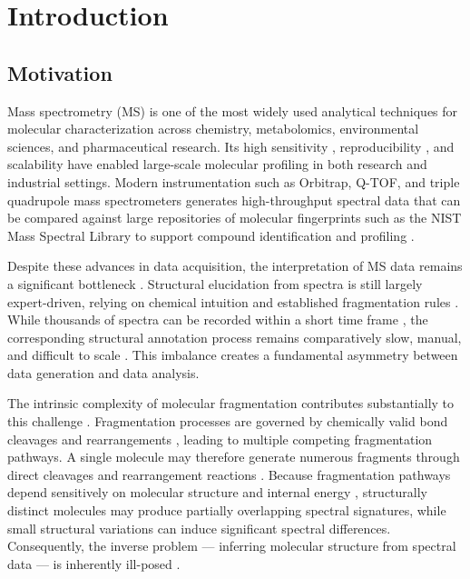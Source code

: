 \chapter{Introduction}
\label{ch:1}
\noindent
\section{Motivation}
Mass spectrometry (MS) is one of the most widely used analytical techniques for molecular characterization across chemistry, metabolomics, environmental sciences, and pharmaceutical research. \cite[p. 1]{Gross2006}
Its high sensitivity \cite[p.~1764]{Cramer2020}, reproducibility \cite[p.~1764]{Cramer2020}, and scalability \cite[p.~1764]{Cramer2020} 
have enabled large-scale molecular profiling in both research and industrial settings.
Modern instrumentation such as Orbitrap, Q-TOF, and triple quadrupole mass spectrometers 
generates high-throughput spectral data that can be compared against large repositories of molecular fingerprints 
such as the NIST Mass Spectral Library to support compound identification and profiling \cite[pp.~7274-7275]{Stein2012}.

Despite these advances in data acquisition, the interpretation of MS data remains a significant bottleneck \cite[p.~1]{Blazenovic2018}. 
Structural elucidation from spectra is still largely expert-driven, relying on chemical intuition and established fragmentation rules \cite[p.~11]{Blazenovic2018}. 
While thousands of spectra can be recorded within a short time frame \cite[p.~1]{Blazenovic2018}, the corresponding structural annotation process remains comparatively slow, manual, and difficult to scale \cite[p.~3]{Blazenovic2018}. 
This imbalance creates a fundamental asymmetry between data generation and data analysis.

The intrinsic complexity of molecular fragmentation contributes substantially to this challenge \cite[p.~240]{Gross2006}. 
Fragmentation processes are governed by chemically valid bond cleavages and rearrangements \cite[pp.~30-31]{Gross2006},
leading to multiple competing fragmentation pathways. 
A single molecule may therefore generate numerous fragments through direct cleavages and rearrangement reactions \cite[p.~240-241]{Gross2006}. 
Because fragmentation pathways depend sensitively on molecular structure and internal energy \cite[p.~26,pp.~30-31]{Gross2006}, 
structurally distinct molecules may produce partially overlapping spectral signatures, while small structural variations can induce significant spectral differences. 
Consequently, the inverse problem --- inferring molecular structure from spectral data --- is inherently ill-posed \cite[p.~240]{Gross2006}.

